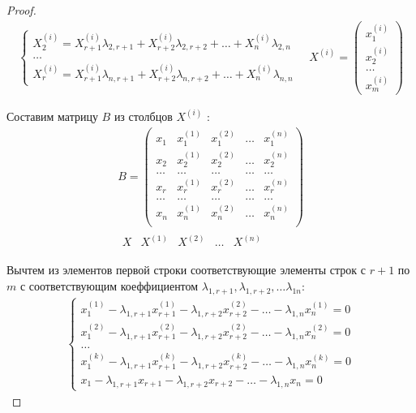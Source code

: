 \begin{proof}
\begin{gather*}
\begin{cases}
      X_2^{(i)} = X_{r+1}^{(i)} \lambda_{2,r+1} + X_{r+2}^{(i)} \lambda_{2,r+2} + \ldots + X_{n}^{(i)} \lambda_{2, n} \\
      \ldots \\
      X_r^{(i)} = X_{r+1}^{(i)} \lambda_{n,r+1} + X_{r+2}^{(i)} \lambda_{n,r+2} + \ldots + X_{n}^{(i)} \lambda_{n, n} \tag{5}
    \end{cases} \quad 
    X^{(i)} = 
    \begin{pmatrix}
      x_1^{(i)} \\ x_2^{(i)} \\ \ldots \\ x_m^{(i)}
    \end{pmatrix}
  \end{gather*}

  Составим матрицу $B$ из столбцов $X^{(i)}$ :
  \begin{align*}
    B =
    \begin{pmatrix}
      x_1 & x_1^{(1)} & x_1^{(2)} & \ldots & x_1^{(n)} \\
      x_2 & x_2^{(1)} & x_2^{(2)} & \ldots & x_2^{(n)} \\
      \ldots & \ldots & \ldots & \ldots & \ldots \\
      x_r & x_r^{(1)} & x_r^{(2)} & \ldots & x_r^{(n)} \\
      \ldots & \ldots & \ldots & \ldots & \ldots \\
      x_n & x_n^{(1)} & x_n^{(2)} & \ldots & x_n^{(n)} \\
    \end{pmatrix} \\
    \begin{matrix}
      X & X^{(1)} & X^{(2)} & \ldots & X^{(n)}
    \end{matrix}
  \end{align*} 

  Вычтем из элементов первой строки соответствующие элементы строк с $r+1$ по $m$ с соответствующим коеффициентом  $\lambda_{1,r+1}, \lambda_{1,r+2}, \ldots \lambda_{1n}$:
  \begin{gather*}
    \begin{cases}
      x_1^{(1)} - \lambda_{1,r+1} x_{r+1}^{(1)} - \lambda_{1,r+2} x_{r+2}^{(2)} - \ldots - \lambda_{1,n} x_{n}^{(1)} = 0 \\
      x_1^{(2)} - \lambda_{1,r+1} x_{r+1}^{(2)} - \lambda_{1,r+2} x_{r+2}^{(2)} - \ldots - \lambda_{1,n} x_{n}^{(2)} = 0 \\
      \ldots \\
      x_1^{(k)} - \lambda_{1,r+1} x_{r+1}^{(k)} - \lambda_{1,r+2} x_{r+2}^{(k)} - \ldots - \lambda_{1,n} x_{n}^{(k)} = 0 \\
      x_1 - \lambda_{1,r+1} x_{r+1} - \lambda_{1,r+2} x_{r+2} - \ldots - \lambda_{1,n} x_{n} = 0
    \end{cases}
  \end{gather*}


\end{proof}
